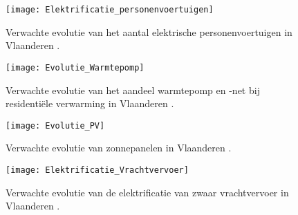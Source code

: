 \begin{figure}
    \centering\texttt{[image: Elektrificatie\_personenvoertuigen]}
    \caption{\label{fig:Aantal_el_personenvoertuigen}Verwachte evolutie van het aantal
        elektrische personenvoertuigen in Vlaanderen \autocite{Verdoodt2022}.}
\end{figure}

\begin{figure}
    \centering\texttt{[image: Evolutie\_Warmtepomp]}
    \caption{\label{fig:Evolutie_Warmtepompen}Verwachte evolutie van het aandeel warmtepomp en -net bij
        residentiële verwarming in Vlaanderen \autocite{Verdoodt2022}.}
\end{figure}

\begin{figure}
    \centering\texttt{[image: Evolutie\_PV]}
    \caption{\label{fig:Evolutie_PV}Verwachte evolutie van zonnepanelen in Vlaanderen \autocite{Verdoodt2022}.}
\end{figure}

\begin{figure}
    \centering\texttt{[image: Elektrificatie\_Vrachtvervoer]}
    \caption{\label{fig:El_Vrachtvervoer}Verwachte evolutie van de elektrificatie van zwaar
        vrachtvervoer in Vlaanderen \autocite{Verdoodt2022}.}
\end{figure}

